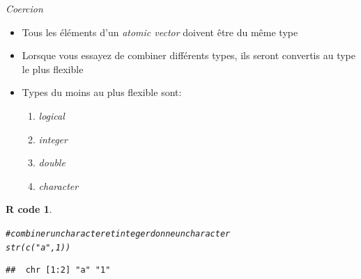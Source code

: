 \documentclass[11pt]{beamer}\usepackage[]{graphicx}\usepackage[]{color}
\makeatletter
\newcommand{\hlnum}[1]{\textcolor[rgb]{0.063,0.58,0.627}{#1}}%
\newcommand{\hlstr}[1]{\textcolor[rgb]{0.063,0.58,0.627}{#1}}%
\newcommand{\hlcom}[1]{\textcolor[rgb]{0.588,0.588,0.588}{#1}}%
\newcommand{\hlstd}[1]{\textcolor[rgb]{0.196,0.196,0.196}{#1}}%
\newcommand{\hlkwd}[1]{\textcolor[rgb]{0.78,0.227,0.412}{#1}}%
\newenvironment{kframe}{%
 \def\at@end@of@kframe{}%
 \ifinner\ifhmode%
  \def\at@end@of@kframe{\end{minipage}}%
  \begin{minipage}{\columnwidth}%
 \fi\fi%
 \def\FrameCommand##1{\hskip\@totalleftmargin \hskip-\fboxsep
 \colorbox{shadecolor}{##1}\hskip-\fboxsep
     \hskip-\linewidth \hskip-\@totalleftmargin \hskip\columnwidth}%
 \MakeFramed {\advance\hsize-\width
   \@totalleftmargin\z@ \linewidth\hsize
   \@setminipage}}%
 {\par\unskip\endMakeFramed%
 \at@end@of@kframe}
\newenvironment{knitrout}{}{} %
\newtheorem{rcode}{R code}[section]
\makeatother
\begin{document}
\begin{frame}[fragile]{\textit{Coercion}}

\begin{itemize}
  \setlength\itemsep{1em}
\item Tous les éléments d'un \textit{atomic vector} doivent être du même type
\pause \item Lorsque vous essayez de combiner différents types, ils seront convertis au type le plus flexible
\pause \item Types du moins au plus flexible sont:
\begin{enumerate}
\item \textit{logical} 
\item \textit{integer} 
\item \textit{double} 
\item \textit{character}
\end{enumerate}
\end{itemize}
\begin{knitrout}
\color{fgcolor}\begin{kframe}
\begin{rcode}\label{unnamed-chunk-16}\begin{alltt}
\hlcom{# combiner un character et integer donne un character}
\hlkwd{str}\hlstd{(}\hlkwd{c}\hlstd{(}\hlstr{"a"}\hlstd{,} \hlnum{1}\hlstd{))}
\end{alltt}
\begin{verbatim}
##  chr [1:2] "a" "1"
\end{verbatim}
\end{rcode}\end{kframe}
\end{knitrout}
\end{frame}
\end{document}
